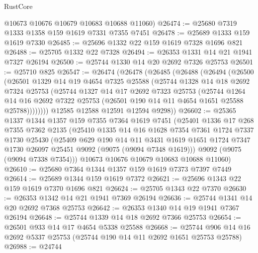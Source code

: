 \begin{lexlean}{RustCore}
\begin{coremodule}
      @10673
      @10676
      @10679
      @10683
      @10688
      @11060)
@26474 := @25680 @7319 @1333 @1358 @159 @1619 @7331 @7355 @7451
@26478 := @25689 @1333 @159 @1619 @7330
@26485 := @25696 @1332 @22 @159 @1619 @7328 @1696 @821
@26488 := @25705 @1332 @22 @7328
@26494 := @26353 @1331 @14 @21 @1941 @7327 @26194
@26500 := @25744 @1330 @14 @20 @2692 @7326 @25753
@26501 := @25710 @825
@26547 := @26474
    (@26478
      (@26485
        (@26488
          (@26494
            (@26500
              (@26501
                @1329
                @14
                @19
                @4654
                @7325
                @25588
                (@25744
                  @1328
                  @14
                  @18
                  @2692
                  @7324
                  @25753
                  (@25744
                    @1327
                    @14
                    @17
                    @2692
                    @7323
                    @25753
                    (@25744
                      @1264
                      @14
                      @16
                      @2692
                      @7322
                      @25753
                      (@26501 @190 @14 @11 @4654 @1651 @25588 @25788))))))))
        @12585
        @12588
        @12591
        @12594
        @9298))
@26602 := @25365
    @1337
    @1344
    @1357
    @159
    @7355
    @7364
    @1619
    @7451
    (@25401
      @1336
      @17
      @268
      @7355
      @7362
      @2135
      (@25410
        @1335
        @14
        @16
        @1628
        @7354
        @7361
        @1724
        @7337
        @1730
        @25430
        (@25409
          @629
          @190
          @14
          @11
          @3431
          @1619
          @1651
          @1724
          @7347
          @1730
          @26097
          @25451
          @9092
          (@9075 (@9094 @7348 @1619)))
        @9092
        (@9075 (@9094 @7338 @7354)))
      @10673
      @10676
      @10679
      @10683
      @10688
      @11060)
@26610 := @25680 @7364 @1344 @1357 @159 @1619 @7373 @7397 @7449
@26614 := @25689 @1344 @159 @1619 @7372
@26621 := @25696 @1343 @22 @159 @1619 @7370 @1696 @821
@26624 := @25705 @1343 @22 @7370
@26630 := @26353 @1342 @14 @21 @1941 @7369 @26194
@26636 := @25744 @1341 @14 @20 @2692 @7368 @25753
@26642 := @26353 @1340 @14 @19 @1941 @7367 @26194
@26648 := @25744 @1339 @14 @18 @2692 @7366 @25753
@26654 := @26501 @933 @14 @17 @4654 @5338 @25588
@26668 := @25744 @906 @14 @16 @2692 @5337 @25753 (@25744 @190 @14 @11 @2692 @1651 @25753 @25788)
@26988 := @24744

\end{coremodule}
\end{lexlean}
